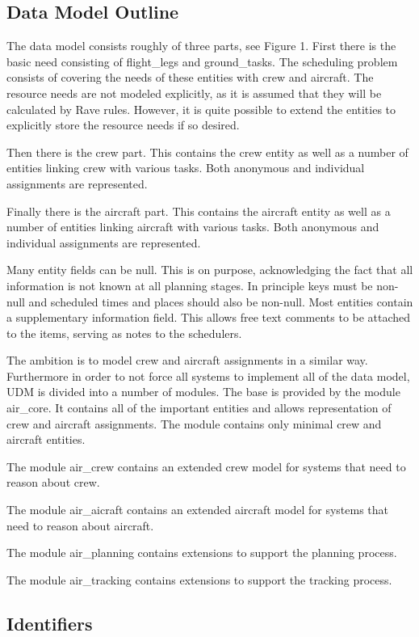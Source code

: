 \documentclass[techdoc]{nobs}   %
\begin{document}
\subsection{Data Model Outline}
\label{sec:outline}

The data model consists roughly of three parts, see Figure 1. First
there is the basic need consisting of flight\_legs and ground\_tasks.
The scheduling problem consists of covering the needs of these entities
with crew and aircraft. The resource needs are not modeled explicitly,
as it is assumed that they will be calculated by Rave rules. However,
it is quite possible to extend the entities to explicitly store the
resource needs if so desired.

Then there is the crew part. This contains the crew entity as well as
a number of entities linking crew with various tasks. Both anonymous
and individual assignments are represented.

Finally there is the aircraft part. This contains the aircraft entity
as well as a number of entities linking aircraft with various tasks.
Both anonymous and individual assignments are represented.

Many entity fields can be null. This is on purpose, acknowledging
the fact that all information is not known at all planning stages.
In principle keys must be non-null and scheduled times and places
should also be non-null. Most entities contain a supplementary
information field. This allows free text comments to be attached
to the items, serving as notes to the schedulers.

The ambition is to model crew and aircraft assignments in a similar
way. Furthermore in order to not force all systems to implement all of
the data model, UDM is divided into a number of modules. The base is
provided by the module air\_core. It contains all of the important
entities and allows representation of crew and aircraft assignments.
The module contains only minimal crew and aircraft entities.

The module air\_crew contains an extended crew model for systems that
need to reason about crew.

The module air\_aicraft contains an extended aircraft model for systems
that need to reason about aircraft.

The module air\_planning contains extensions to support the planning
process.

The module air\_tracking contains extensions to support the tracking
process.

\subsection{Identifiers}
\label{sec:Identifiers}
\end{document}

